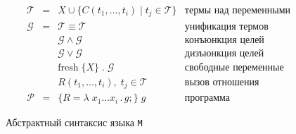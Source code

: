 \documentclass[12pt]{article}
\begin{document}
\begin{figure*}[h!]
  \[
  \begin{array}{cccll}
    &\mathcal{T} & = & X \cup \{C (t_1, \dots, t_i) \mid t_j\in\mathcal{T}\} & \mbox{термы над переменными} \\
    &\mathcal{G} & = & \mathcal{T}\equiv\mathcal{T}   &  \mbox{унификация термов} \\
    &            &   & \mathcal{G}\wedge\mathcal{G}     & \mbox{конъюнкция целей} \\
    &            &   & \mathcal{G}\vee\mathcal{G}       &\mbox{дизъюнкция целей} \\
    &            &   & \mbox{fresh}\;\{X\}\;.\;\mathcal{G} & \mbox{свободные переменные} \\
    &            &   & R (t_1,\dots,t_i),\;t_j\in\mathcal{T} & \mbox{вызов отношения} \\
    &\mathcal{P} & = & \{R = \lambda\;x_1\dots x_{i}\,.\, g;\}\; g & \mbox{программа}
  \end{array}
  \]
  \cprotect\caption{Абстрактный синтаксис языка \verb!M!}
  \label{syntax}
\end{figure*}
\end{document}
